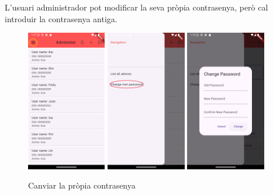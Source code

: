 \documentclass[a4paper,12pt,twoside]{ThesisStyle}
\begin{document}
L'usuari administrador pot modificar la seva pròpia contrasenya, però cal introduir la contrasenya antiga.

\begin{figure}[h]
    \centering
    \includegraphics[width=0.31\textwidth]{imatges/adminMain.png}
    \includegraphics[width=0.31\textwidth]{imatges/adminNavigation2.png}
    \includegraphics[width=0.31\textwidth]{imatges/adminchangepassword.png}
    \caption{Canviar la pròpia contrasenya}
    \label{fig:Canviar la pròpia contrasenya }
\end{figure}
\end{document}
